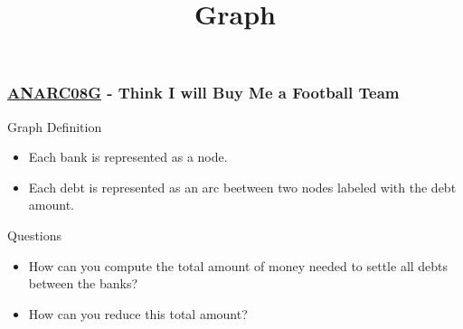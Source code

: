 \documentclass{beamer}
\title{Graph}
\newcommand{\ANAR}{\href{https://www.spoj.com/problems/ANARC08G/}{ANARC08G}}
\begin{document}
\frame{
  \titlepage
}



\begin{frame}[fragile]
  \frametitle{\ANAR{} - Think I will Buy Me a Football Team}

  \begin{block}{Graph Definition}
    \begin{itemize}
    \item Each bank is represented as a node.
    \item Each debt is represented as an arc beetween two nodes labeled with the debt amount.
    \end{itemize}
  \end{block}


  \begin{exampleblock}{Questions}
    \begin{itemize}
    \item How can you compute the total amount of money needed to settle all debts between the banks?
    \item How can you reduce this total amount?  
    \end{itemize}
  \end{exampleblock}

\end{frame}
\end{document}
